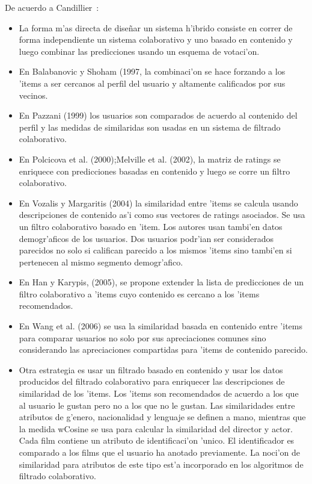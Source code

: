 \documentclass[11pt]{article}
\begin{document}
\medskip
De acuerdo a Candillier~\cite{start:candillier09}:\\
\begin{itemize}
\item La forma m'as directa de dise\~{n}ar un sistema h'ibrido consiste en correr de forma independiente un sistema colaborativo y uno basado en contenido y luego combinar las predicciones usando un esquema de votaci'on.
\item En Balabanovic y Shoham (1997, la combinaci'on se hace forzando a los 'items a ser cercanos al perfil del usuario y altamente calificados por sus vecinos.
\item En Pazzani (1999) los usuarios son comparados de acuerdo al contenido del perfil y las medidas de similaridas son usadas en un sistema de filtrado colaborativo.
\item En Polcicova et al. (2000);Melville et al. (2002), la matriz de ratings se enriquece con predicciones basadas en contenido y luego se corre un filtro colaborativo.
\item En Vozalis y Margaritis (2004) la similaridad entre 'items se calcula usando descripciones de contenido as'i como sus vectores de ratings asociados. Se usa un filtro colaborativo basado en 'item. Los autores usan tambi'en datos demogr'aficos de los usuarios. Dos usuarios podr'ian ser considerados parecidos no solo si califican parecido a los mismos 'items sino tambi'en si pertenecen al mismo segmento demogr'afico.
\item En Han y Karypis, (2005), se propone extender la lista de predicciones de un filtro colaborativo a 'items cuyo contenido es cercano a los 'items recomendados.
\item En Wang et al. (2006) se usa la similaridad basada en contenido entre 'items para comparar usuarios no solo por sus apreciaciones comunes sino considerando las apreciaciones compartidas para 'items de contenido parecido.
\item Otra estrategia es usar un filtrado basado en contenido y usar los datos producidos del filtrado colaborativo para enriquecer las descripciones de similaridad de los 'items. Los 'items son recomendados de acuerdo a los que al usuario le gustan pero no a los que no le gustan. Las similaridades entre atributos de g'enero, nacionalidad y lenguaje se definen a mano, mientras que la medida wCosine se usa para calcular la similaridad del director y actor. Cada film contiene un atributo de identificaci'on 'unico. El identificador es comparado a los films que el usuario ha anotado previamente. La noci'on de similaridad para atributos de este tipo est'a incorporado en los algoritmos de filtrado colaborativo.
\end{itemize}
\end{document}
